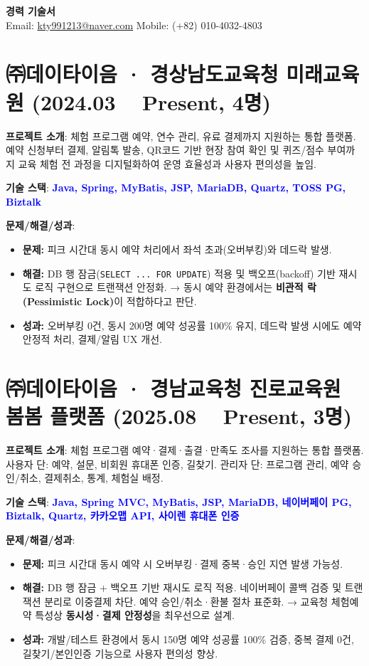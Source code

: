 \documentclass[a4paper,11pt]{article}
\newcommand{\tech}[1]{\textbf{\textcolor{blue}{#1}}}
\begin{document}
\begin{center}
    {\LARGE \textbf{경력 기술서}} \\[6pt]
    Email: \href{mailto:kty991213@naver.com}{kty991213@naver.com} \quad
    Mobile: (+82) 010-4032-4803
\end{center}

\section{㈜데이타이음 · 경상남도교육청 미래교육원 (2024.03 ~ Present, 4명)}

\textbf{프로젝트 소개}:  
체험 프로그램 예약, 연수 관리, 유료 결제까지 지원하는 통합 플랫폼.  
예약 신청부터 결제, 알림톡 발송, QR코드 기반 현장 참여 확인 및 퀴즈/점수 부여까지 교육 체험 전 과정을 디지털화하여 운영 효율성과 사용자 편의성을 높임.  

\textbf{기술 스택}: \tech{Java, Spring, MyBatis, JSP, MariaDB, Quartz, TOSS PG, Biztalk}  

\textbf{문제/해결/성과}:
\begin{itemize}[leftmargin=*]
  \item \textbf{문제:} 피크 시간대 동시 예약 처리에서 좌석 초과(오버부킹)와 데드락 발생.
  \item \textbf{해결:} DB 행 잠금(\texttt{SELECT ... FOR UPDATE}) 적용 및 백오프(backoff) 기반 재시도 로직 구현으로 트랜잭션 안정화.  
  → 동시 예약 환경에서는 \textbf{비관적 락(Pessimistic Lock)}이 적합하다고 판단.
  \item \textbf{성과:} 오버부킹 0건, 동시 200명 예약 성공률 100\% 유지, 데드락 발생 시에도 예약 안정적 처리, 결제/알림 UX 개선.
\end{itemize}

\section{㈜데이타이음 · 경남교육청 진로교육원 봄봄 플랫폼 (2025.08 ~ Present, 3명)}

\textbf{프로젝트 소개}:  
체험 프로그램 예약·결제·출결·만족도 조사를 지원하는 통합 플랫폼.  
사용자 단: 예약, 설문, 비회원 휴대폰 인증, 길찾기.  
관리자 단: 프로그램 관리, 예약 승인/취소, 결제취소, 통계, 체험실 배정.  

\textbf{기술 스택}: \tech{Java, Spring MVC, MyBatis, JSP, MariaDB, 네이버페이 PG, Biztalk, Quartz, 카카오맵 API, 사이렌 휴대폰 인증}  

\textbf{문제/해결/성과}:
\begin{itemize}[leftmargin=*]
  \item \textbf{문제:} 피크 시간대 동시 예약 시 오버부킹·결제 중복·승인 지연 발생 가능성.
  \item \textbf{해결:} DB 행 잠금 + 백오프 기반 재시도 로직 적용. 네이버페이 콜백 검증 및 트랜잭션 분리로 이중결제 차단. 예약 승인/취소·환불 절차 표준화.  
  → 교육청 체험예약 특성상 \textbf{동시성·결제 안정성}을 최우선으로 설계.
  \item \textbf{성과:} 개발/테스트 환경에서 동시 150명 예약 성공률 100\% 검증, 중복 결제 0건, 길찾기/본인인증 기능으로 사용자 편의성 향상.
\end{itemize}
\end{document}
